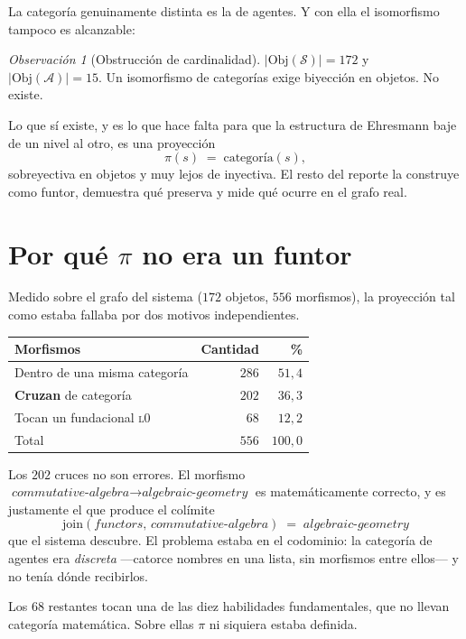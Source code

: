 \documentclass[11pt,a4paper]{article}
\theoremstyle{plain}
\theoremstyle{definition}
\theoremstyle{remark}
\newtheorem{observacion}[teorema]{Observación}
\newcommand{\Skills}{\mathcal{S}}
\newcommand{\Agentes}{\mathcal{A}}
\begin{document}
La categoría genuinamente distinta es la de agentes. Y con ella el isomorfismo
tampoco es alcanzable:

\begin{observacion}[Obstrucción de cardinalidad]
$|\mathrm{Obj}(\Skills)| = 172$ y $|\mathrm{Obj}(\Agentes)| = 15$. Un
isomorfismo de categorías exige biyección en objetos. No existe.
\end{observacion}

Lo que sí existe, y es lo que hace falta para que la estructura de Ehresmann
baje de un nivel al otro, es una proyección
\[
  \pi(s) \;=\; \text{categoría}(s),
\]
sobreyectiva en objetos y muy lejos de inyectiva. El resto del reporte la
construye como funtor, demuestra qué preserva y mide qué ocurre en el grafo
real.

\section{Por qué $\pi$ no era un funtor}

Medido sobre el grafo del sistema ($172$ objetos, $556$ morfismos), la
proyección tal como estaba fallaba por dos motivos independientes.

\begin{center}
\begin{tabular}{lrr}
\toprule
Morfismos & Cantidad & \% \\
\midrule
Dentro de una misma categoría & $286$ & $51{,}4$ \\
\textbf{Cruzan} de categoría & $202$ & $36{,}3$ \\
Tocan un fundacional \textsc{l0} & $68$ & $12{,}2$ \\
\midrule
Total & $556$ & $100{,}0$ \\
\bottomrule
\end{tabular}
\end{center}

Los $202$ cruces no son errores. El morfismo
$\textit{commutative-algebra} \to \textit{algebraic-geometry}$ es
matemáticamente correcto, y es justamente el que produce el colímite
\[
  \mathrm{join}(\textit{functors},\,\textit{commutative-algebra})
  \;=\; \textit{algebraic-geometry}
\]
que el sistema descubre. El problema estaba en el
codominio: la categoría de agentes era \emph{discreta} —catorce nombres en una
lista, sin morfismos entre ellos— y no tenía dónde recibirlos.

Los $68$ restantes tocan una de las diez habilidades fundamentales, que no
llevan categoría matemática. Sobre ellas $\pi$ ni siquiera estaba definida.
\end{document}
